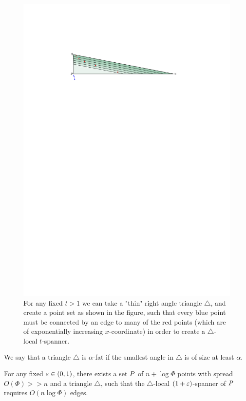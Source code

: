 \documentclass[12pt]{article}%
\begin{document}
\begin{figure}[h]
    \centering \includegraphics{figs/triangle_lower_bound}
    \caption{For any fixed $t>1$ we can take a "thin" right angle
       triangle $\triangle$, and create a point set as shown in the
       figure, such that every blue point must be connected by an edge
       to many of the red points (which are of exponentially
       increasing $x$-coordinate) in order to create a
       $\triangle$-local $t$-spanner.}
\end{figure}


\begin{defn}
    We say that a triangle $\triangle$ is $\alpha$-fat if the smallest
    angle in $\triangle$ is of size at least $\alpha$.
\end{defn}

\begin{claim}
    For any fixed $\varepsilon \in (0,1)$, there exists a set $P$ of
    $n+\log\Phi$ points with spread $O(\Phi)>> n$ and a triangle
    $\triangle$, such that the $\triangle$-local $(1+\varepsilon)$-spanner of
    $P$ requires $O\left(n\log\Phi\right)$ edges.
\end{claim}
\end{document}
